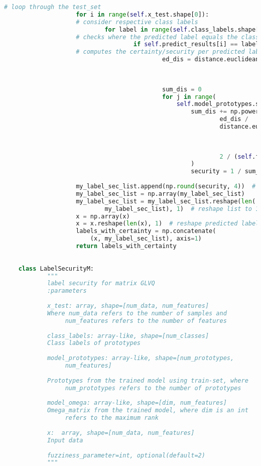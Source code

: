 \documentclass[english]{HSMW-Thesis}
\begin{document}
\begin{lstlisting}[caption=label\textunderscore security1.py ,style=chstyle, language=Python]
					# loop through the test_set
					for i in range(self.x_test.shape[0]):		
					# consider respective class labels
							for label in range(self.class_labels.shape[0]):
					# checks where the predicted label equals the class label
									if self.predict_results[i] == label:
					# computes the certainty/security per predicted label
											ed_dis = distance.euclidean(self.x_test[i,
																		0:self.x_dat.shape[1]],
																		self.model_prototypes[label,
																		0:self.x_dat.shape[1]])
											sum_dis = 0
											for j in range(
												self.model_prototypes.shape[0]):
													sum_dis += np.power(
															ed_dis /
															distance.euclidean(self.x_test[i,
																				0:self.x_dat.shape[1]],
																				self.model_prototypes[j,
																				0:self.x_dat.shape[1]]),
															2 / (self.fuzziness_parameter - 1)
													)
													security = 1 / sum_dis
	
					my_label_sec_list.append(np.round(security, 4))  # add the computed label certainty to list above
					my_label_sec_list = np.array(my_label_sec_list)
					my_label_sec_list = my_label_sec_list.reshape(len(
							my_label_sec_list), 1)  # reshape list to 1-D array
					x = np.array(x)
					x = x.reshape(len(x), 1)  # reshape predicted labels into 1-D array
					labels_with_certainty = np.concatenate(
						(x, my_label_sec_list), axis=1)
					return labels_with_certainty
	
	
	class LabelSecurityM:
			"""
			label security for matrix GLVQ
			:parameters
			
			x_test: array, shape=[num_data, num_features]
			Where num_data refers to the number of samples and
				 num_features refers to the number of features
			
			class_labels: array-like, shape=[num_classes]
			Class labels of prototypes
			
			model_prototypes: array-like, shape=[num_prototypes,
				 num_features]
			
			Prototypes from the trained model using train-set, where
				 num_prototypes refers to the number of prototypes
			
			model_omega: array-like, shape=[dim, num_features]
			Omega_matrix from the trained model, where dim is an int
				 refers to the maximum rank
			
			x:  array, shape=[num_data, num_features]
			Input data
			
			fuzziness_parameter=int, optional(default=2)
			"""
	

\end{lstlisting}
\end{document}
